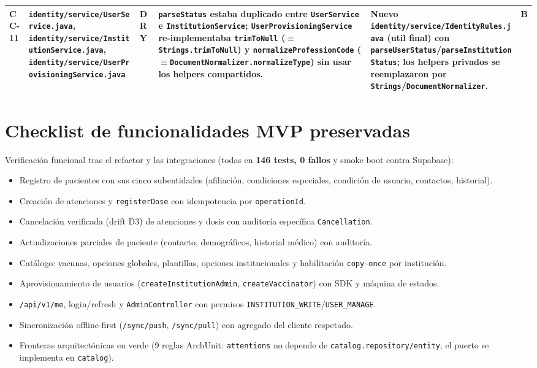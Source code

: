 \documentclass[11pt,a4paper]{article}
\begin{document}
\begin{footnotesize}
\begin{longtable}{@{}p{0.9cm}p{3.1cm}p{2.4cm}p{3.5cm}p{3.7cm}p{1.0cm}@{}}
CC-11 & \texttt{identity/service/UserService.java}, \texttt{identity/service/InstitutionService.java}, \texttt{identity/service/UserProvisioningService.java} & DRY &
\texttt{parseStatus} estaba duplicado entre \texttt{UserService} e \texttt{InstitutionService}; \texttt{UserProvisioningService} re-implementaba \texttt{trimToNull} ($\equiv$\texttt{Strings.trimToNull}) y \texttt{normalizeProfessionCode} ($\equiv$\texttt{DocumentNormalizer.normalizeType}) sin usar los helpers compartidos. &
Nuevo \texttt{identity/service/IdentityRules.java} (util final) con \texttt{parseUserStatus}/\texttt{parseInstitutionStatus}; los helpers privados se reemplazaron por \texttt{Strings}/\texttt{DocumentNormalizer}. &
B \\
\bottomrule
\end{longtable}
\end{footnotesize}

\section{Checklist de funcionalidades MVP preservadas} \label{sec:mvp}

Verificación funcional tras el refactor y las integraciones (todas en
\textbf{146 tests, 0 fallos} y smoke boot contra Supabase):

\begin{itemize}
  \item[\checkmark] Registro de pacientes con sus cinco subentidades (afiliación,
        condiciones especiales, condición de usuario, contactos, historial).
  \item[\checkmark] Creación de atenciones y \texttt{registerDose} con
        idempotencia por \texttt{operationId}.
  \item[\checkmark] Cancelación verificada (drift D3) de atenciones y dosis con
        auditoría específica \texttt{Cancellation}.
  \item[\checkmark] Actualizaciones parciales de paciente (contacto,
        demográficos, historial médico) con auditoría.
  \item[\checkmark] Catálogo: vacunas, opciones globales, plantillas, opciones
        institucionales y habilitación \texttt{copy-once} por institución.
  \item[\checkmark] Aprovisionamiento de usuarios (\texttt{createInstitutionAdmin},
        \texttt{createVaccinator}) con SDK y máquina de estados.
  \item[\checkmark] \texttt{/api/v1/me}, login/refresh y \texttt{AdminController}
        con permisos \texttt{INSTITUTION\_WRITE}/\texttt{USER\_MANAGE}.
  \item[\checkmark] Sincronización offline-first (\texttt{/sync/push},
        \texttt{/sync/pull}) con agregado del cliente respetado.
  \item[\checkmark] Fronteras arquitectónicas en verde (9 reglas ArchUnit:
        \texttt{attentions} no depende de \texttt{catalog.repository/entity};
        el puerto se implementa en \texttt{catalog}).
\end{itemize}
\end{document}
